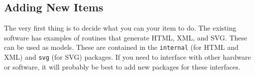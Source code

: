 \documentclass[10pt, openany]{book}
\begin{document}
\subsection{Adding New Items}
The very first thing is to decide what you can your item to do.  The existing software has examples of routines that generate HTML, XML, and SVG.  These can be used as models.  These are contained in the \texttt{internal} (for HTML and XML) and \texttt{svg} (for SVG) packages.  If you need to interface with other hardware or software, it will probably be best to add new packages for these interfaces.
\end{document}
